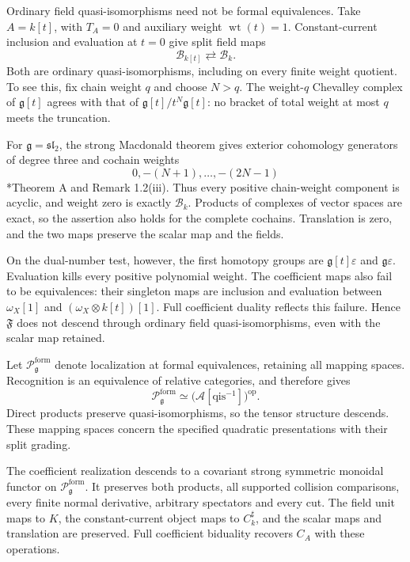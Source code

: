 \begin{example}\label{cycmp:ex:polynomial-collapse}
Ordinary field quasi-isomorphisms need not be formal equivalences.
Take $A=k[t]$, with $T_A=0$ and auxiliary weight
$\operatorname{wt}(t)=1$. Constant-current inclusion and evaluation
at $t=0$ give split field maps
\[
 \mathcal B_{k[t]}\rightleftarrows\mathcal B_k.
\]
Both are ordinary quasi-isomorphisms, including on every finite
weight quotient. To see this, fix chain weight $q$ and choose $N>q$.
The weight-$q$ Chevalley complex of $\mathfrak g[t]$ agrees with
that of $\mathfrak g[t]/t^N\mathfrak g[t]$: no bracket of total
weight at most $q$ meets the truncation.

For $\mathfrak g=\mathfrak{sl}_2$, the strong Macdonald theorem gives
exterior cohomology generators of degree three and cochain weights
\[
 0,-(N+1),\ldots,-(2N-1)
\]
\cite{cycmp:FGT}*{Theorem A and Remark 1.2(iii)}.
Thus every positive chain-weight component is acyclic, and weight
zero is exactly $\mathcal B_k$. Products of complexes of vector
spaces are exact, so the assertion also holds for the complete
cochains. Translation is zero, and the two maps preserve the scalar
map and the fields.

On the dual-number test, however, the first homotopy groups are
$\mathfrak g[t]\varepsilon$ and $\mathfrak g\varepsilon$.
Evaluation kills every positive polynomial weight. The coefficient
maps also fail to be equivalences: their singleton maps are inclusion
and evaluation between $\omega_X[1]$ and
$(\omega_X\otimes k[t])[1]$. Full coefficient duality reflects this
failure. Hence $\mathfrak F$ does not descend through ordinary
field quasi-isomorphisms, even with the scalar map retained.
\end{example}

Let $\mathcal P_{\mathfrak g}^{\mathrm{form}}$ denote localization
at formal equivalences, retaining all mapping spaces. Recognition
is an equivalence of relative categories, and therefore gives
\[
 \mathcal P_{\mathfrak g}^{\mathrm{form}}
 \simeq\bigl(\mathcal A[\mathrm{qis}^{-1}]\bigr)^{\mathrm{op}}.
\]
Direct products preserve quasi-isomorphisms, so the tensor structure
descends. These mapping spaces concern the specified quadratic
presentations with their split grading.

\begin{corollary}\label{cycmp:cor:formal-realization}
The coefficient realization descends to a covariant strong symmetric
monoidal functor on $\mathcal P_{\mathfrak g}^{\mathrm{form}}$.
It preserves both products, all supported collision comparisons,
every finite normal derivative, arbitrary spectators and every cut.
The field unit maps to $K$, the constant-current object maps to
$C_k^\sharp$, and the scalar maps and translation are preserved.
Full coefficient biduality recovers $C_A$ with these operations.
\end{corollary}

